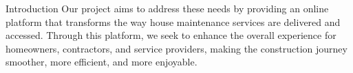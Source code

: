 \documentclass{beamer} %
\begin{document}
\begin{frame}{Introduction}
    Our project aims to address these needs by providing an online platform that transforms the way house maintenance services are delivered and accessed. Through this platform, we seek to enhance the overall experience for homeowners, contractors, and service providers, making the construction journey smoother, more efficient, and more enjoyable.
    
    
    \vspace{10pt} %
    \begin{figure}
        \hfill
                
                
                
                
                
      
    \end{figure}
\end{frame}
\end{document}
